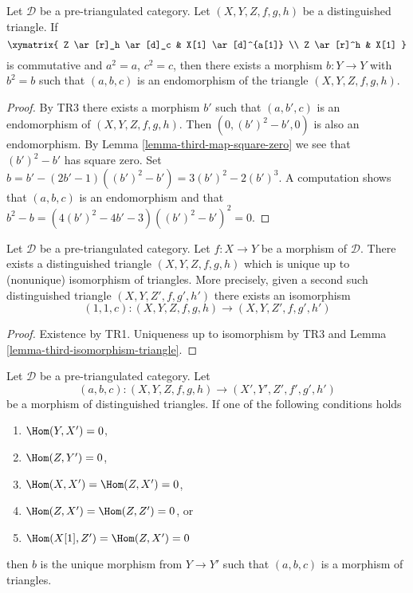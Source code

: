 \begin{lemma}
\label{lemma-third-map-idempotent}
Let $\mathcal{D}$ be a pre-triangulated category.
Let $(X, Y, Z, f, g, h)$ be a distinguished triangle.
If
$$
\xymatrix{
Z \ar[r]_h \ar[d]_c & X[1] \ar[d]^{a[1]} \\
Z \ar[r]^h & X[1]
}
$$
is commutative and $a^2 = a$, $c^2 = c$, then there exists a
morphism $b : Y \to Y$ with $b^2 = b$ such that
$(a, b, c)$ is an endomorphism of the triangle $(X, Y, Z, f, g, h)$.
\end{lemma}

\begin{proof}
By TR3 there exists a morphism $b'$ such that
$(a, b', c)$ is an endomorphism of $(X, Y, Z, f, g, h)$.
Then $(0, (b')^2 - b', 0)$ is also an endomorphism. By
Lemma \ref{lemma-third-map-square-zero}
we see that $(b')^2 - b'$ has square zero.
Set $b = b' - (2b' - 1)((b')^2 - b') = 3(b')^2 - 2(b')^3$.
A computation shows that $(a, b, c)$ is an endomorphism and
that $b^2 - b = (4(b')^2 - 4b' - 3)((b')^2 - b')^2 = 0$.
\end{proof}

\begin{lemma}
\label{lemma-cone-triangle-unique-isomorphism}
Let $\mathcal{D}$ be a pre-triangulated category.
Let $f : X \to Y$ be a morphism of $\mathcal{D}$.
There exists a distinguished triangle $(X, Y, Z, f, g, h)$ which
is unique up to (nonunique) isomorphism of triangles.
More precisely, given a second such distinguished triangle
$(X, Y, Z', f, g', h')$ there exists an isomorphism
$$
(1, 1, c) : (X, Y, Z, f, g, h) \longrightarrow (X, Y, Z', f, g', h')
$$
\end{lemma}

\begin{proof}
Existence by TR1. Uniqueness up to isomorphism by TR3 and
Lemma \ref{lemma-third-isomorphism-triangle}.
\end{proof}

\begin{lemma}
\label{lemma-uniqueness-third-arrow}
Let $\mathcal{D}$ be a pre-triangulated category. Let
$$
(a, b, c) : (X, Y, Z, f, g, h) \to (X', Y', Z', f', g', h')
$$
be a morphism of distinguished triangles. If one of the following
conditions holds
\begin{enumerate}
\item $\Hom(Y, X') = 0$,
\item $\Hom(Z, Y') = 0$,
\item $\Hom(X, X') = \Hom(Z, X') = 0$,
\item $\Hom(Z, X') = \Hom(Z, Z') = 0$, or
\item $\Hom(X[1], Z') = \Hom(Z, X') = 0$
\end{enumerate}
then $b$ is the unique morphism from $Y \to Y'$ such that
$(a, b, c)$ is a morphism of triangles.
\end{lemma}

